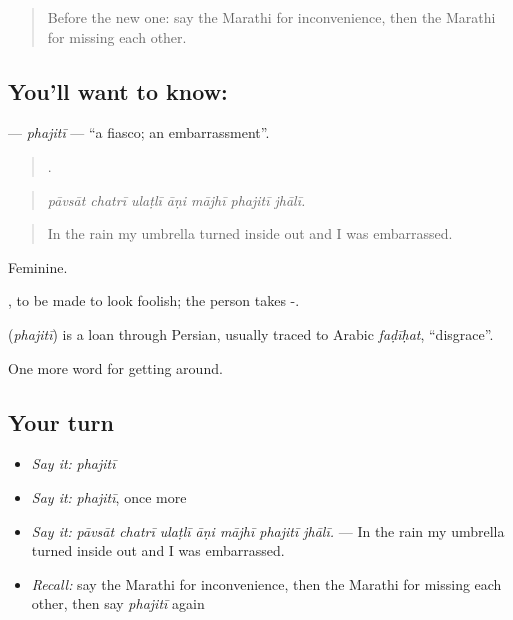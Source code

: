 \label{lesson:MR-C434-phajiti}



\begin{quote}
Before the new one: say the Marathi for inconvenience, then the Marathi for missing each other.
\end{quote}

\subsection*{You'll want to know: }
\textbf{} — \emph{phajitī} — \textquotedblleft{}a fiasco; an embarrassment\textquotedblright{}.

\begin{quote}
      .
\end{quote}

\begin{quote}
\emph{pāvsāt chatrī ulaṭlī āṇi mājhī phajitī jhālī.}
\end{quote}

\begin{quote}
In the rain my umbrella turned inside out and I was embarrassed.
\end{quote}

Feminine.

 , to be made to look foolish; the person takes -.

\begin{cousinweb}
\textbf{} (\emph{phajitī}) is a loan through Persian, usually traced to Arabic \emph{faḍīḥat}, \textquotedblleft{}disgrace\textquotedblright{}.
\end{cousinweb}

\begin{grammarlens}[title={What you've built}]
One more word for getting around.
\end{grammarlens}

\subsection*{Your turn}
\begin{itemize}
\raggedright
  \item \emph{Say it:} \emph{phajitī}
  \item \emph{Say it:} \emph{phajitī}, once more
  \item \emph{Say it:} \emph{pāvsāt chatrī ulaṭlī āṇi mājhī phajitī jhālī.} — In the rain my umbrella turned inside out and I was embarrassed.
  \item \emph{Recall:} say the Marathi for inconvenience, then the Marathi for missing each other, then say \emph{phajitī} again
\end{itemize}

